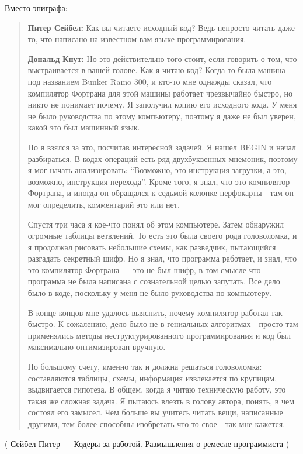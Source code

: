 Вместо эпиграфа:

\begin{framed}
\begin{quotation}

\textbf{Питер Сейбел:} Как вы читаете исходный код? Ведь непросто читать даже то, что написано на известном вам языке программирования.

\textbf{Дональд Кнут:} Но это действительно того стоит, если говорить о том, что выстраивается в вашей голове. Как я читаю код? Когда-то была машина под названием Bunker Ramo 300, и кто-то мне однажды сказал, что компилятор Фортрана для этой машины работает чрезвычайно быстро, но никто не понимает почему. Я заполучил копию его исходного кода. У меня не было руководства по этому компьютеру, поэтому я даже не был уверен, какой это был машинный язык.

Но я взялся за это, посчитав интересной задачей. Я нашел BEGIN и начал разбираться. В кодах операций есть ряд двухбуквенных мнемоник, поэтому я мог начать анализировать: “Возможно, это инструкция загрузки, а это, возможно, инструкция перехода”. Кроме того, я знал, что это компилятор Фортрана, и иногда он обращался к седьмой колонке перфокарты - там он мог определить, комментарий это или нет.

Спустя три часа я кое-что понял об этом компьютере. Затем обнаружил огромные таблицы ветвлений. То есть это была своего рода головоломка, и я продолжал рисовать небольшие схемы, как разведчик, пытающийся разгадать секретный шифр. Но я знал, что программа работает, и знал, что это компилятор Фортрана — это не был шифр, в том смысле что программа не была написана с сознательной целью запутать. Все дело было в коде, поскольку у меня не было руководства по компьютеру.

В конце концов мне удалось выяснить, почему компилятор работал так быстро. К сожалению, дело было не в гениальных алгоритмах - просто там применялись методы неструктурированного программирования и код был максимально оптимизирован вручную.

По большому счету, именно так и должна решаться головоломка: составляются таблицы, схемы, информация извлекается по крупицам, выдвигается гипотеза. В общем, когда я читаю техническую работу, это такая же сложная задача. Я пытаюсь влезть в голову автора, понять, в чем состоял его замысел. Чем больше вы учитесь читать вещи, написанные другими, тем более способны изобретать что-то свое - так мне кажется. 

\end{quotation}
\end{framed}

( Сейбел Питер --- Кодеры за работой. Размышления о ремесле программиста )

